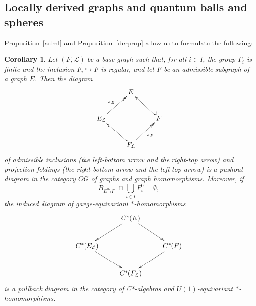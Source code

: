 \documentclass[12pt,times,a4paper]{amsart}
\newtheorem{corollary}[theorem]{Corollary}
\numberwithin{equation}{section}
\numberwithin{equation}{section}
\begin{document}
\subsection{Locally derived graphs and quantum balls and spheres}
Proposition~\ref{adml} and Proposition~\ref{derprop} allow us to formulate the following:
\begin{corollary}\label{lastcor}
Let $(F,\mathcal{L})$ be a base graph such that, for all $i\in I$, the group $\Gamma_i$ is finite and the inclusion 
$F_i\hookrightarrow F$ is regular, and let  $F$ be an admissible subgraph of a graph $E$.
Then the  diagram
\begin{equation}\label{loopush}
\xymatrix{
& E &\\
E_{\mathcal{L}} \ar^{\pi_E}@{>>}[ur] & & F \ar@{_{(}->}[ul]\\
& F_\mathcal{L} \ar_{\pi_F}@{>>}[ur] \ar@{_{(}->}[ul] &
}
\end{equation}
 of admissible inclusions (the left-bottom arrow and the right-top arrow) and  projection foldings
(the right-bottom arrow and the left-top arrow)  is a pushout diagram in the category $OG$ of graphs and graph homomorphisms. 
Moreover, if 
\begin{equation}\label{breakingL}
B_{E^0\setminus F^0}\cap \bigcup_{i\in I} F_i^0=\emptyset,
\end{equation} 
the induced diagram of gauge-equivariant $*$-homomorphisms
\begin{equation*}
\xymatrix{
&
C^*(E)
\ar[dl] \ar[dr]&\\
C^*(E_{\mathcal{L}})
\ar[dr] & & 
C^*(F)
\ar[dl]\\
& C^*(F_{\mathcal{L}}) &
}
\end{equation*}
is a pullback diagram in the category of C*-algebras and $U(1)$-equivariant $*$-homomorphisms.
\end{corollary}
\end{document}
